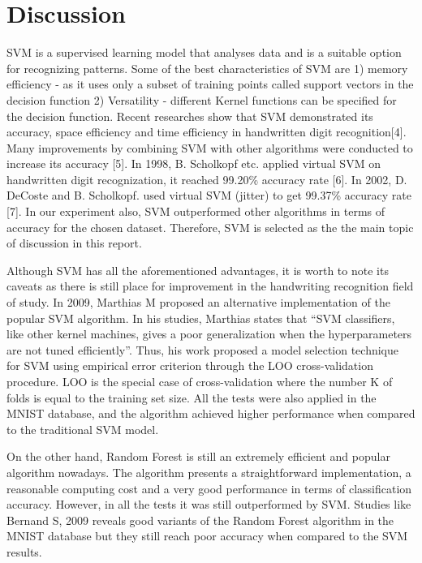 \documentclass[letterpaper,10pt]{article}
\theoremstyle{mytheor}
\begin{document}
\section{Discussion}

SVM is a supervised learning model that analyses data and is a suitable option for recognizing patterns. Some of the best characteristics of SVM are 1) memory efficiency - as it uses only a subset of training points called support vectors  in the decision function 2) Versatility - different Kernel functions can be specified for the decision function. Recent researches show that SVM demonstrated its accuracy, space efficiency and time efficiency in handwritten digit recognition[4]. Many improvements by combining SVM with other algorithms  were conducted to increase its accuracy [5]. In 1998, B. Scholkopf etc. applied virtual SVM on handwritten digit recognization, it reached 99.20\% accuracy rate [6]. In 2002, D. DeCoste and B. Scholkopf. used virtual SVM (jitter) to get 99.37\% accuracy rate [7]. In our experiment also, SVM outperformed other algorithms in terms of accuracy for the chosen dataset. Therefore, SVM is selected as the  the main topic of discussion in this report.

Although SVM has all the aforementioned advantages, it is worth to note its caveats as there is still place for improvement in the handwriting recognition field of study. In 2009, Marthias M proposed an alternative implementation of the popular SVM algorithm. In his studies, Marthias states that “SVM classifiers, like other kernel machines, gives a poor generalization when the hyperparameters are not tuned efficiently”. Thus, his work proposed a model selection technique for SVM using empirical error criterion through the LOO cross-validation procedure. LOO is the special case of cross-validation where the number K of folds is equal to the training set size. All the tests were also applied in the MNIST database, and the algorithm achieved higher performance when compared to the traditional SVM model.

On the other hand, Random Forest is still an extremely efficient and popular algorithm nowadays. The algorithm presents a straightforward implementation, a reasonable computing cost and a very good performance in terms of classification accuracy. However, in all the tests it was still outperformed by SVM. Studies like Bernand S, 2009 reveals good variants of the Random Forest algorithm in the MNIST database but they still reach poor accuracy when compared to the SVM results.
\end{document}
